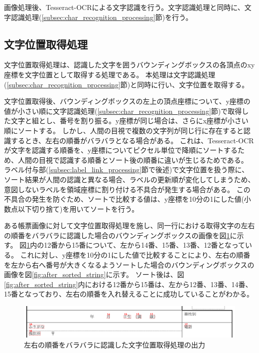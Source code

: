 画像処理後、Tesseract-OCRによる文字認識を行う。文字認識処理と同時に、文字認識処理(\ref{subsec:char_recognition_processing}節)を行う。


\subsection{文字位置取得処理}\label{subsec:char_position_obtainment_processing}
文字位置取得処理は、認識した文字を囲うバウンディングボックスの各頂点のxy座標を文字位置として取得する処理である。
本処理は文字認識処理(\ref{subsec:char_recognition_processing}節)と同時に行い、文字位置を取得する。

文字位置取得後、バウンディングボックスの左上の頂点座標について、y座標の値が小さい順に文字認識処理(\ref{subsec:char_recognition_processing}節)で取得した文字と組とし、番号を割り振る。y座標が同じ場合は、さらにx座標が小さい順にソートする。
しかし、人間の目視で複数の文字列が同じ行に存在すると認識するとき、左右の順番がバラバラとなる場合がある。
これは、Tesseract-OCRが文字を認識する順番を、y座標についてピクセル単位で降順にソートするため、人間の目視で認識する順番とソート後の順番に違いが生じるためである。
ラベル付与部(\ref{subsec:label_link_processing}節で後述)で文字位置を扱う際に、ソート結果が人間の認識と異なる場合、ラベルの更新順が変化してしまうため、意図しないラベルを領域座標に割り付ける不具合が発生する場合がある。
この不具合の発生を防ぐため、ソートで比較する値は、y座標を10分の1にした値(小数点以下切り捨て)を用いてソートを行う。

ある帳票画像に対して文字位置取得処理を施し、同一行における取得文字の左右の順番をバラバラに認識した場合のバウンディングボックスの画像を図\ref{fig:before_sorted_string}に示す。
図\ref{fig:before_sorted_string}内の12番から15番について、左から14番、15番、13番、12番となっている。
これに対し、y座標を10分の1にした値で比較することにより、左右の順番を左から右へ番号が大きくなるようソートした場合のバウンディングボックスの画像を図\ref{fig:after_sorted_string}に示す。
ソート後は、図\ref{fig:after_sorted_string}内における12番から15番は、左から12番、13番、14番、15番となっており、左右の順番を入れ替えることに成功していることがわかる。

\begin{figure}[t]
    \begin{center}
        \includegraphics[width=15cm]{image/04-implementation/before_sorted_string.png}
        \caption{左右の順番をバラバラに認識した文字位置取得処理の出力}
        \label{fig:before_sorted_string}
    \end{center}
\end{figure}

